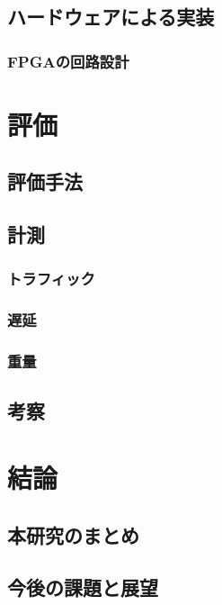\section{ハードウェアによる実装}
\subsection{FPGAの回路設計}

\chapter{評価}
\label{chap:evaluation}
\section{評価手法}
\section{計測}
\subsection{トラフィック}
\subsection{遅延}
\subsection{重量}
\section{考察}

\chapter{結論}
\label{chap:conclusion}
\section{本研究のまとめ}
\section{今後の課題と展望}
